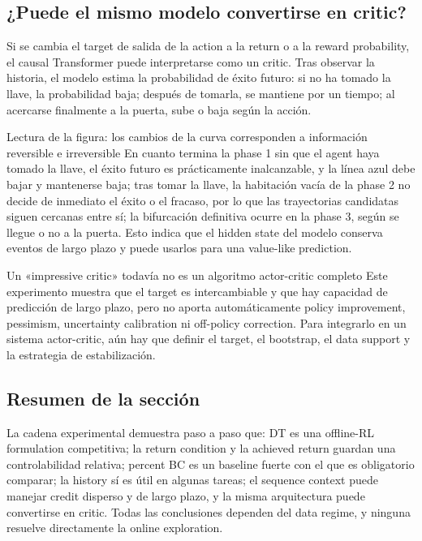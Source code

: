 \subsection{¿Puede el mismo modelo convertirse en critic?}

Si se cambia el target de salida de la action a la return o a la reward probability, el causal Transformer puede interpretarse como un critic. Tras observar la historia, el modelo estima la probabilidad de éxito futuro: si no ha tomado la llave, la probabilidad baja; después de tomarla, se mantiene por un tiempo; al acercarse finalmente a la puerta, sube o baja según la acción.


\begin{knowledgebox}{Lectura de la figura: los cambios de la curva corresponden a información reversible e irreversible}
En cuanto termina la phase 1 sin que el agent haya tomado la llave, el éxito futuro es prácticamente inalcanzable, y la línea azul debe bajar y mantenerse baja; tras tomar la llave, la habitación vacía de la phase 2 no decide de inmediato el éxito o el fracaso, por lo que las trayectorias candidatas siguen cercanas entre sí; la bifurcación definitiva ocurre en la phase 3, según se llegue o no a la puerta. Esto indica que el hidden state del modelo conserva eventos de largo plazo y puede usarlos para una value-like prediction.
\end{knowledgebox}

\begin{warningbox}{Un «impressive critic» todavía no es un algoritmo actor-critic completo}
Este experimento muestra que el target es intercambiable y que hay capacidad de predicción de largo plazo, pero no aporta automáticamente policy improvement, pessimism, uncertainty calibration ni off-policy correction. Para integrarlo en un sistema actor-critic, aún hay que definir el target, el bootstrap, el data support y la estrategia de estabilización.
\end{warningbox}

\subsection{Resumen de la sección}

La cadena experimental demuestra paso a paso que: DT es una offline-RL formulation competitiva; la return condition y la achieved return guardan una controlabilidad relativa; percent BC es un baseline fuerte con el que es obligatorio comparar; la history sí es útil en algunas tareas; el sequence context puede manejar credit disperso y de largo plazo, y la misma arquitectura puede convertirse en critic. Todas las conclusiones dependen del data regime, y ninguna resuelve directamente la online exploration.
